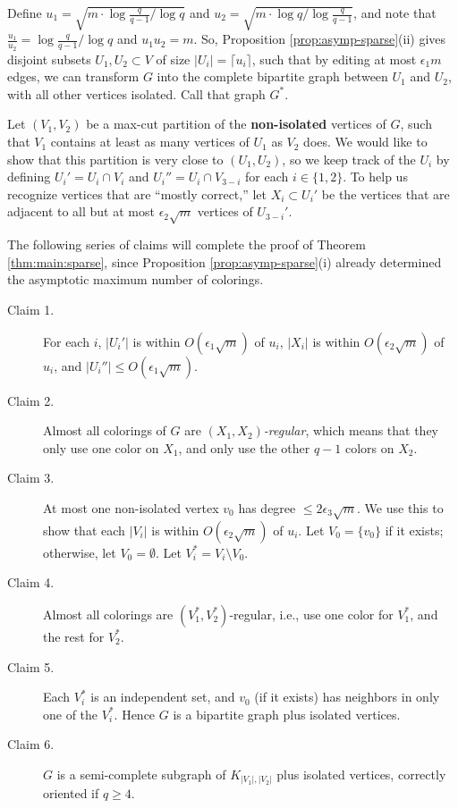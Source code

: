 \documentclass[11pt]{article}
\begin{document}
Define $u_1 = \sqrt{m \cdot \log \frac{q}{q-1} / \log q}$ and $u_2 =
\sqrt{m \cdot \log q / \log \frac{q}{q-1}}$, and note that
$\frac{u_1}{u_2} = \log \frac{q}{q-1} / \log q$ and $u_1 u_2 = m$.
So, Proposition \ref{prop:asymp-sparse}(ii) gives disjoint subsets
$U_1, U_2 \subset V$ of size $|U_i| = \lceil u_i \rceil$, such that by
editing at most $\epsilon_1 m$ edges, we can transform $G$ into the
complete bipartite graph between $U_1$ and $U_2$, with all other
vertices isolated.  Call that graph $G^*$.

Let $(V_1, V_2)$ be a max-cut partition of the \textbf{non-isolated}
vertices of $G$, such that $V_1$ contains at least as many vertices of
$U_1$ as $V_2$ does.  We would like to show that this partition is
very close to $(U_1, U_2)$, so we keep track of the $U_i$ by defining
$U_i' = U_i \cap V_i$ and $U_i'' = U_i \cap V_{3-i}$ for each $i \in
\{1, 2\}$.  To help us recognize vertices that are ``mostly correct,''
let $X_i \subset U_i'$ be the vertices that are adjacent to all but at
most $\epsilon_2\sqrt{m}$ vertices of $U_{3-i}'$.

The following series of claims will complete the proof of Theorem
\ref{thm:main:sparse}, since Proposition \ref{prop:asymp-sparse}(i)
already determined the asymptotic maximum number of colorings.


\begin{description}

\item[Claim 1.] For each $i$, $|U_i'|$ is within $O(\epsilon_1
  \sqrt{m})$ of $u_i$, $|X_i|$ is within $O(\epsilon_2 \sqrt{m})$ of
  $u_i$, and $|U_i''| \leq O(\epsilon_1 \sqrt{m})$.

\item[Claim 2.] Almost all colorings of $G$ are \emph{$(X_1,
    X_2)$-regular}, which means that they only use one color on $X_1$,
  and only use the other $q-1$ colors on $X_2$.

\item[Claim 3.] At most one non-isolated vertex $v_0$ has degree $\leq
  2 \epsilon_3 \sqrt{m}$.  We use this to show that each $|V_i|$ is
  within $O(\epsilon_2 \sqrt{m})$ of $u_i$.  Let $V_0 = \{v_0\}$ if it
  exists; otherwise, let $V_0 = \emptyset$.  Let $V_i^* = V_i
  \setminus V_0$.

\item[Claim 4.]  Almost all colorings are $(V_1^*, V_2^*)$-regular,
  i.e., use one color for $V_1^*$, and the rest for $V_2^*$.

\item[Claim 5.] Each $V_i^*$ is an independent set, and $v_0$ (if it
  exists) has neighbors in only one of the $V_i^*$.  Hence $G$ is a
  bipartite graph plus isolated vertices.

\item[Claim 6.] $G$ is a semi-complete subgraph of $K_{|V_1|, |V_2|}$
  plus isolated vertices, correctly oriented if $q \geq 4$.

\end{description}
\end{document}
